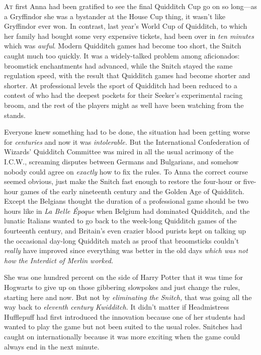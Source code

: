 
\lettrine{A}{t} first Anna had
been gratified to see the final Quidditch Cup go on so long---as a Gryffindor
she was a bystander at the House Cup thing, it wasn't like Gryffindor ever won.
In contrast, last year's World Cup of Quidditch, to which her family had bought
some very expensive tickets, had been over in \emph{ten minutes} which was
\emph{awful}. Modern Quidditch games had become too short, the Snitch caught
much too quickly. It was a widely-talked problem among aficionados: broomstick
enchantments had advanced, while the Snitch stayed the same regulation speed,
with the result that Quidditch games had become shorter and shorter. At
professional levels the sport of Quidditch had been reduced to a contest of who
had the deepest pockets for their Seeker's experimental racing broom, and the
rest of the players might as well have been watching from the stands.

Everyone knew something had to be done, the situation had been getting worse
for \emph{centuries} and now it was \emph{intolerable.} But the International
Confederation of Wizards' Quidditch Committee was mired in all the usual
acrimony of the I.C.W., screaming disputes between Germans and Bulgarians, and
somehow nobody could agree on \emph{exactly} how to fix the rules. To Anna the
correct course seemed obvious, just make the Snitch fast enough to restore the
four-hour or five-hour games of the early nineteenth century and the Golden Age
of Quidditch. Except the Belgians thought the duration of a professional game
should be two hours like in \emph{La Belle Époque} when Belgium had dominated
Quidditch, and the lunatic Italians wanted to go back to the week-long
Quidditch games of the fourteenth century, and Britain's even crazier blood
purists kept on talking up the occasional day-long Quidditch match as proof
that broomsticks couldn't \emph{really} have improved since everything was
better in the old days \emph{which was not how the Interdict of Merlin worked.}

She was one hundred percent on the side of Harry Potter that it was time for
Hogwarts to give up on those gibbering slowpokes and just change the rules,
starting here and now. But not by \emph{eliminating the Snitch,} that was going
all the way back to \emph{eleventh century Kwidditch.} It didn't matter if
Headmistress Hufflepuff had first introduced the innovation because one of her
students had wanted to play the game but not been suited to the usual roles.
Snitches had caught on internationally because it was more exciting when the
game could always end in the next minute.

